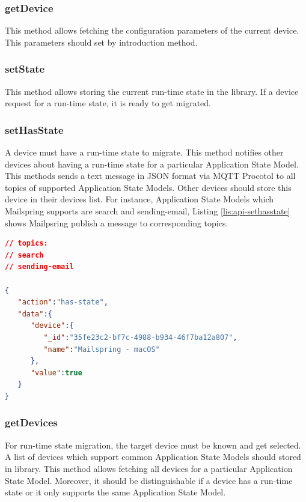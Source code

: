 \subsubsection{getDevice}
This method allows fetching the configuration parameters of the current device. This parameters should set by introduction method.

\subsubsection{setState}
This method allows storing the current run-time state in the library. If a  device request for a run-time state, it is ready to get migrated. 

\subsubsection{setHasState}
A device must have a run-time state to migrate. This method notifies other devices about having a run-time state for a particular Application State Model. This methods sends a text message in JSON format via MQTT Procotol to all topics of supported Application State Models. Other devices should store this device in their devices list. For instance, Application State Models which Mailspring supports are search and sending-email, Listing \ref{lis:api-sethasstate} shows Mailpsring publish a message to corresponding topics.

\lstset{
  label=lis:api-sethasstate,caption=Mailspring informs other devices that has a run-time state.
}
\begin{lstlisting}[language=json]
// topics:
// search
// sending-email

{
   "action":"has-state",
   "data":{
      "device":{
         "_id":"35fe23c2-bf7c-4988-b934-46f7ba12a807",
         "name":"Mailspring - macOS"
      },
      "value":true
   }
}
\end{lstlisting}


\subsubsection{getDevices}
For run-time state migration, the target device must be known and get selected. A list of devices which support common Application State Models should stored in library. This method allows fetching all devices for a particular Application State Model. Moreover, it should be distinguishable if a device has a run-time state or it only supports the same Application State Model.

